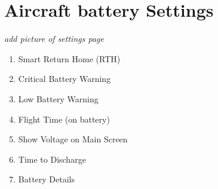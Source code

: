 \documentclass[
]{book}
\providecommand{\tightlist}{%
  \setlength{\itemsep}{0pt}\setlength{\parskip}{0pt}}
\begin{document}
\hypertarget{aircraft-battery-settings}{%
\section{Aircraft battery Settings}\label{aircraft-battery-settings}}

\emph{add picture of settings page}

\begin{enumerate}
\def\labelenumi{\arabic{enumi}.}
\tightlist
\item
  Smart Return Home (RTH)
\item
  Critical Battery Warning
\item
  Low Battery Warning
\item
  Flight Time (on battery)
\item
  Show Voltage on Main Screen
\item
  Time to Discharge
\item
  Battery Details
\end{enumerate}
\end{document}
